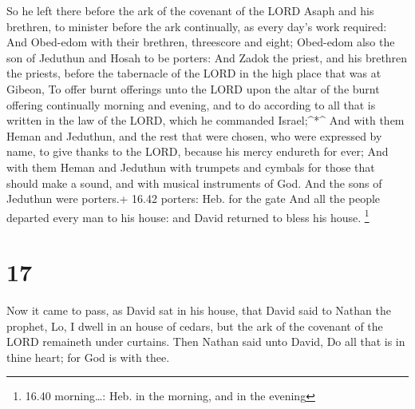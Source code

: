  So he left there before the ark of the covenant of the
LORD Asaph and his brethren, to minister before the ark continually, as
every day's work required:  And Obed-edom with their
brethren, threescore and eight; Obed-edom also the son of Jeduthun and
Hosah to be porters:  And Zadok the priest, and his
brethren the priests, before the tabernacle of the LORD in the high
place that was at Gibeon,  To offer burnt offerings unto
the LORD upon the altar of the burnt offering continually morning and
evening, and to do according to all that is written in the law of the
LORD, which he commanded Israel;\^{}*\^{}  And with them
Heman and Jeduthun, and the rest that were chosen, who were expressed by
name, to give thanks to the LORD, because his mercy endureth for ever;
 And with them Heman and Jeduthun with trumpets and cymbals
for those that should make a sound, and with musical instruments of God.
And the sons of Jeduthun were porters.+ 16.42 porters: Heb. for the gate
 And all the people departed every man to his house: and
David returned to bless his house. \footnote{16.40 morning\ldots: Heb.
  in the morning, and in the evening}

\hypertarget{section-16}{%
\section{17}\label{section-16}}

 Now it came to pass, as David sat in his house, that David
said to Nathan the prophet, Lo, I dwell in an house of cedars, but the
ark of the covenant of the LORD remaineth under curtains. 
Then Nathan said unto David, Do all that is in thine heart; for God is
with thee.

